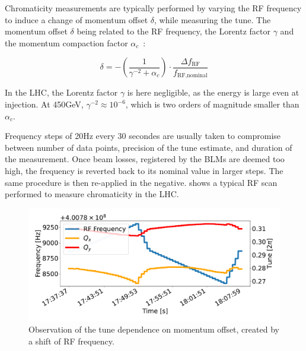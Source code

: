 Chromaticity measurements are typically performed by varying the RF frequency to induce a change of
momentum offset $\delta$, while measuring the tune.  The momentum offset $\delta$ being related to
the RF frequency, the Lorentz factor $\gamma$ and the momentum compaction factor
$\alpha_c$~\cite{keintzel_jacqueline_beam_nodate}:

\begin{equation}
    \delta = - \left(\frac{1}{\gamma^{-2} + \alpha_c}\right) \cdot \frac{\Delta f_{\text{RF}}}{f_{\text{RF,nominal}}}
    \label{eq:dpp_rf}
\end{equation}

In the LHC, the Lorentz factor $\gamma$ is here negligible, as the energy is large even at injection.
At 450GeV, $\gamma^{-2} \approx 10^{-6}$, which is two orders of magnitude smaller than $\alpha_c$.

Frequency steps of 20Hz every 30 secondes are usually taken to compromise between number of data
points, precision of the tune estimate, and duration of the measurement. Once beam losses,
registered by the BLMs are deemed too high, the frequency is reverted back to its nominal value in
larger steps. The same procedure is then re-applied in the negative.
 shows a typical RF scan performed to measure chromaticity in the
LHC.

\begin{figure}[H]
    \centering
    \includegraphics[width=1\textwidth]{images/rf_scan.pdf}
    \caption{Observation of the tune dependence on momentum offset, created by a shift of RF
             frequency.}
    \label{fig:measurements:rf_scan}
\end{figure}




\subsubsection{}

